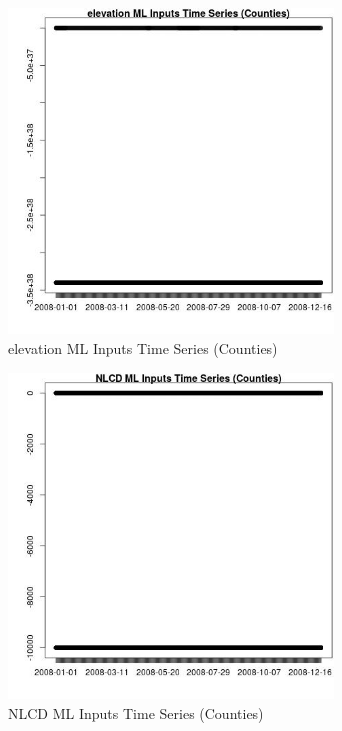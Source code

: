 \begin{figure} 
\centering  
\includegraphics[width=0.77\textwidth]{Code_Outputs/ML_input_report_ML_input_CountyGeometricCentroids_Locations_Dates_part_c_2008-01-01to2008-12-31_elevationTS.jpg} 
\caption{\label{fig:ML_input_report_ML_input_CountyGeometricCentroids_Locations_Dates_part_c_2008-01-01to2008-12-31elevationTS}elevation ML Inputs Time Series (Counties)} 
\end{figure} 
 

\begin{figure} 
\centering  
\includegraphics[width=0.77\textwidth]{Code_Outputs/ML_input_report_ML_input_CountyGeometricCentroids_Locations_Dates_part_c_2008-01-01to2008-12-31_NLCDTS.jpg} 
\caption{\label{fig:ML_input_report_ML_input_CountyGeometricCentroids_Locations_Dates_part_c_2008-01-01to2008-12-31NLCDTS}NLCD ML Inputs Time Series (Counties)} 
\end{figure} 
 
